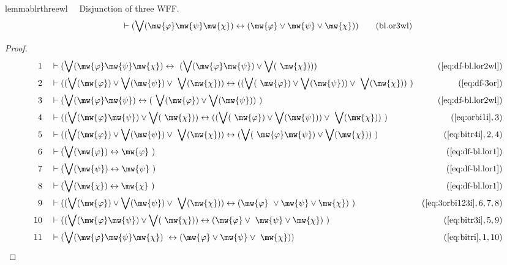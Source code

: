 \begin{restatable}{lemma}{blrthreewl}~~ Disjunction of three WFF.
\begin{align}
\vdash ( \bigvee( \mw{\varphi} \mw{\psi} \mw{\chi} ) \leftrightarrow (
    \mw{\varphi} \vee \mw{\psi} \vee \mw{\chi} )
    )\label{eq:bl.or3wl}\tag{bl.or3wl}
\end{align}
\end{restatable}

\begin{proof}
\begin{align}
  1 &&  & \vdash ( \bigvee( \mw{\varphi} \mw{\psi} \mw{\chi} ) \leftrightarrow
     ~( \bigvee( \mw{\varphi} \mw{\psi} ) \vee \bigvee(
     ~\mw{\chi} ) ) )&(\mbox{\ref{eq:df-bl.lor2wl}})\notag
  \\ 2 &&  & \vdash ( ( \bigvee( \mw{\varphi} ) \vee \bigvee( \mw{\psi} ) \vee
     ~\bigvee( \mw{\chi} ) ) \leftrightarrow ( ( \bigvee(
     ~\mw{\varphi} ) \vee \bigvee( \mw{\psi} ) ) \vee
     ~\bigvee( \mw{\chi} ) )
     ~)&(\mbox{\ref{eq:df-3or}})\notag
  \\ 3 &&  & \vdash ( \bigvee( \mw{\varphi} \mw{\psi} ) \leftrightarrow (
     ~\bigvee( \mw{\varphi} ) \vee \bigvee( \mw{\psi} ) )
     ~)&(\mbox{\ref{eq:df-bl.lor2wl}})\notag
  \\ 4 &&  & \vdash ( ( \bigvee( \mw{\varphi} \mw{\psi} ) \vee \bigvee(
     ~\mw{\chi} ) ) \leftrightarrow ( ( \bigvee(
     ~\mw{\varphi} ) \vee \bigvee( \mw{\psi} ) ) \vee
     ~\bigvee( \mw{\chi} ) )
     ~)&(\mbox{\ref{eq:orbi1i}},3)\notag
  \\ 5 &&  & \vdash ( ( \bigvee( \mw{\varphi} ) \vee \bigvee( \mw{\psi} ) \vee
     ~\bigvee( \mw{\chi} ) ) \leftrightarrow ( \bigvee(
     ~\mw{\varphi} \mw{\psi} ) \vee \bigvee( \mw{\chi} ) )
     ~)&(\mbox{\ref{eq:bitr4i}},2,4)\notag
  \\ 6 &&  & \vdash ( \bigvee( \mw{\varphi} ) \leftrightarrow \mw{\varphi}
     ~)&(\mbox{\ref{eq:df-bl.lor1}})\notag
  \\ 7 &&  & \vdash ( \bigvee( \mw{\psi} ) \leftrightarrow \mw{\psi}
     ~)&(\mbox{\ref{eq:df-bl.lor1}})\notag
  \\ 8 &&  & \vdash ( \bigvee( \mw{\chi} ) \leftrightarrow \mw{\chi}
     ~)&(\mbox{\ref{eq:df-bl.lor1}})\notag
  \\ 9 &&  & \vdash ( ( \bigvee( \mw{\varphi} ) \vee \bigvee( \mw{\psi} ) \vee
     ~\bigvee( \mw{\chi} ) ) \leftrightarrow ( \mw{\varphi}
     ~\vee \mw{\psi} \vee \mw{\chi} )
     ~)&(\mbox{\ref{eq:3orbi123i}},6,7,8)\notag
  \\ 10 &&  & \vdash ( ( \bigvee( \mw{\varphi} \mw{\psi} ) \vee \bigvee(
     ~\mw{\chi} ) ) \leftrightarrow ( \mw{\varphi} \vee
     ~\mw{\psi} \vee \mw{\chi} )
     ~)&(\mbox{\ref{eq:bitr3i}},5,9)\notag
  \\ 11 &&  & \vdash ( \bigvee( \mw{\varphi} \mw{\psi} \mw{\chi} )
     ~\leftrightarrow ( \mw{\varphi} \vee \mw{\psi} \vee
     ~\mw{\chi} ) )&(\mbox{\ref{eq:bitri}},1,10)\notag
\end{align}
\end{proof}

